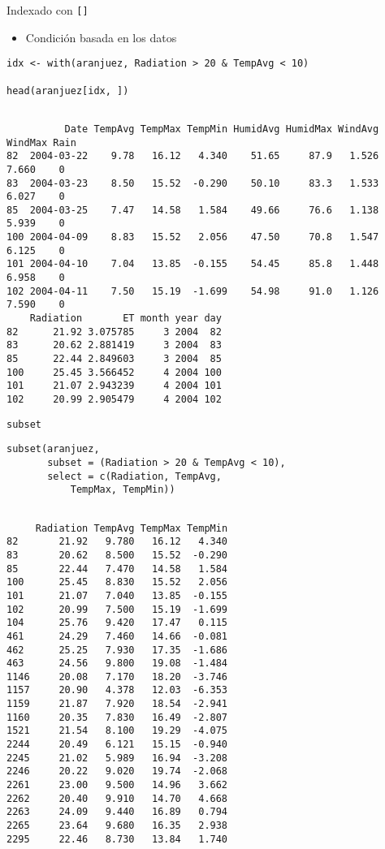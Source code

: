 \documentclass[aspectratio=169, usenames,svgnames,dvipsnames]{beamer}
\begin{document}
\begin{frame}[label={sec:org300ffbb},fragile]{Indexado con \texttt{[]}}
 \begin{itemize}
\item Condición basada en los datos
\end{itemize}
\lstset{language=r,label= ,caption= ,captionpos=b,numbers=none}
\begin{lstlisting}
idx <- with(aranjuez, Radiation > 20 & TempAvg < 10) 

head(aranjuez[idx, ])
\end{lstlisting}

\begin{verbatim}

          Date TempAvg TempMax TempMin HumidAvg HumidMax WindAvg WindMax Rain
82  2004-03-22    9.78   16.12   4.340    51.65     87.9   1.526   7.660    0
83  2004-03-23    8.50   15.52  -0.290    50.10     83.3   1.533   6.027    0
85  2004-03-25    7.47   14.58   1.584    49.66     76.6   1.138   5.939    0
100 2004-04-09    8.83   15.52   2.056    47.50     70.8   1.547   6.125    0
101 2004-04-10    7.04   13.85  -0.155    54.45     85.8   1.448   6.958    0
102 2004-04-11    7.50   15.19  -1.699    54.98     91.0   1.126   7.590    0
    Radiation       ET month year day
82      21.92 3.075785     3 2004  82
83      20.62 2.881419     3 2004  83
85      22.44 2.849603     3 2004  85
100     25.45 3.566452     4 2004 100
101     21.07 2.943239     4 2004 101
102     20.99 2.905479     4 2004 102
\end{verbatim}
\end{frame}

\begin{frame}[label={sec:org38fe785},fragile]{\texttt{subset}}
 \lstset{language=r,label= ,caption= ,captionpos=b,numbers=none}
\begin{lstlisting}
subset(aranjuez,
       subset = (Radiation > 20 & TempAvg < 10),
       select = c(Radiation, TempAvg,
           TempMax, TempMin))
\end{lstlisting}

\begin{verbatim}

     Radiation TempAvg TempMax TempMin
82       21.92   9.780   16.12   4.340
83       20.62   8.500   15.52  -0.290
85       22.44   7.470   14.58   1.584
100      25.45   8.830   15.52   2.056
101      21.07   7.040   13.85  -0.155
102      20.99   7.500   15.19  -1.699
104      25.76   9.420   17.47   0.115
461      24.29   7.460   14.66  -0.081
462      25.25   7.930   17.35  -1.686
463      24.56   9.800   19.08  -1.484
1146     20.08   7.170   18.20  -3.746
1157     20.90   4.378   12.03  -6.353
1159     21.87   7.920   18.54  -2.941
1160     20.35   7.830   16.49  -2.807
1521     21.54   8.100   19.29  -4.075
2244     20.49   6.121   15.15  -0.940
2245     21.02   5.989   16.94  -3.208
2246     20.22   9.020   19.74  -2.068
2261     23.00   9.500   14.96   3.662
2262     20.40   9.910   14.70   4.668
2263     24.09   9.440   16.89   0.794
2265     23.64   9.680   16.35   2.938
2295     22.46   8.730   13.84   1.740
\end{verbatim}
\end{frame}
\end{document}
